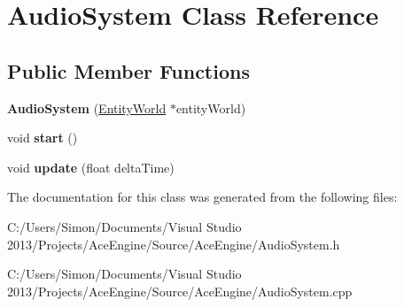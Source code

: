 \hypertarget{class_audio_system}{}\section{Audio\+System Class Reference}
\label{class_audio_system}
\subsection*{Public Member Functions}
\begin{DoxyCompactItemize}
\item 
\hypertarget{class_audio_system_accf9fda76c14df05603132421c43b7e4}{}{\bfseries Audio\+System} (\hyperlink{class_entity_world}{Entity\+World} $\ast$entity\+World)\label{class_audio_system_accf9fda76c14df05603132421c43b7e4}

\item 
\hypertarget{class_audio_system_a4edf9ab7c54d773292e712a353d0b406}{}void {\bfseries start} ()\label{class_audio_system_a4edf9ab7c54d773292e712a353d0b406}

\item 
\hypertarget{class_audio_system_a1e3849471338bf0bf38fbc96357dc16f}{}void {\bfseries update} (float delta\+Time)\label{class_audio_system_a1e3849471338bf0bf38fbc96357dc16f}

\end{DoxyCompactItemize}


The documentation for this class was generated from the following files\+:\begin{DoxyCompactItemize}
\item 
C\+:/\+Users/\+Simon/\+Documents/\+Visual Studio 2013/\+Projects/\+Ace\+Engine/\+Source/\+Ace\+Engine/Audio\+System.\+h\item 
C\+:/\+Users/\+Simon/\+Documents/\+Visual Studio 2013/\+Projects/\+Ace\+Engine/\+Source/\+Ace\+Engine/Audio\+System.\+cpp\end{DoxyCompactItemize}
